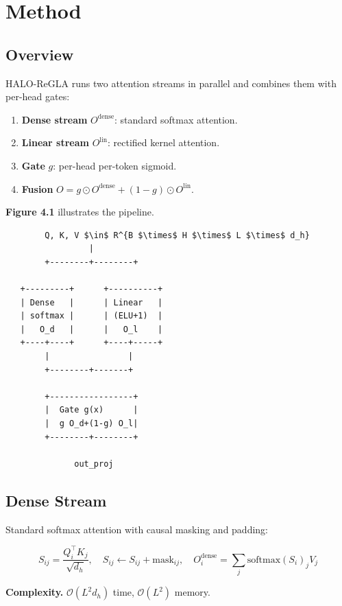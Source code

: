 
\section{Method}

\subsection{Overview}

HALO-ReGLA runs two attention streams in parallel and combines them with 
per-head gates:

\begin{enumerate}
\item \textbf{Dense stream} $O^\text{dense}$: standard softmax attention.
\item \textbf{Linear stream} $O^\text{lin}$: rectified kernel attention.
\item \textbf{Gate} $g$: per-head per-token sigmoid.
\item \textbf{Fusion} $O = g \odot O^\text{dense} + (1 - g) \odot O^\text{lin}$.

\end{enumerate}
\textbf{Figure 4.1} illustrates the pipeline.

\begin{lstlisting}
        Q, K, V $\in$ R^{B $\times$ H $\times$ L $\times$ d_h}
                 |
        +--------+--------+
                           
   +---------+      +----------+
   | Dense   |      | Linear   |
   | softmax |      | (ELU+1)  |
   |   O_d   |      |   O_l    |
   +----+----+      +----+-----+
        |                |
        +--------+-------+
                  
        +-----------------+
        |  Gate g(x)      |
        |  g O_d+(1-g) O_l|
        +--------+--------+
                  
              out_proj
\end{lstlisting}

\subsection{Dense Stream}

Standard softmax attention with causal masking and padding:

\[
S_{ij} = \frac{Q_i^\top K_j}{\sqrt{d_h}}, \quad
S_{ij} \leftarrow S_{ij} + \text{mask}_{ij}, \quad
O^\text{dense}_i = \sum_j \text{softmax}(S_i)_j V_j
\]

\textbf{Complexity.} $\mathcal{O}(L^2 d_h)$ time, $\mathcal{O}(L^2)$ memory.

